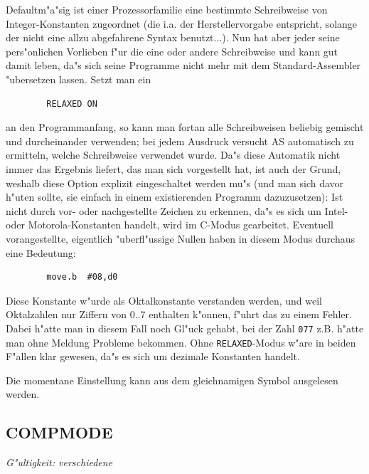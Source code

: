 \documentclass[12pt,a4paper,twoside]{report}
\makeatletter
\newcommand{\tty}[1]{{\tt #1}}
\newcommand{\ttindex}[1]{\index{#1@{\tt #1}}}
\newcommand{\asname}{AS}
\makeatother
\begin{document}
Defaultm"a"sig ist einer Prozessorfamilie eine bestimmte Schreibweise
von Integer-Konstanten zugeordnet (die i.a. der Herstellervorgabe
entspricht, solange der nicht eine allzu abgefahrene Syntax benutzt...).
Nun hat aber jeder seine pers"onlichen Vorlieben f"ur die eine oder
andere Schreibweise und kann gut damit leben, da"s sich seine Programme
nicht mehr mit dem Standard-Assembler "ubersetzen lassen. Setzt man ein
\begin{verbatim}
        RELAXED ON
\end{verbatim}
an den Programmanfang, so kann man fortan alle Schreibweisen beliebig
gemischt und durcheinander verwenden; bei jedem Ausdruck versucht \asname{}
automatisch zu ermitteln, welche Schreibweise verwendet wurde.  Da"s
diese Automatik nicht immer das Ergebnis liefert, das man sich vorgestellt
hat, ist auch der Grund, weshalb diese Option explizit eingeschaltet
werden mu"s (und man sich davor h"uten sollte, sie einfach in einem
existierenden Programm dazuzusetzen): Ist nicht durch vor- oder
nachgestellte Zeichen zu erkennen, da"s es sich um Intel- oder
Motorola-Konstanten handelt, wird im C-Modus gearbeitet.  Eventuell
vorangestellte, eigentlich "uberfl"ussige Nullen haben in diesem Modus
durchaus eine Bedeutung:
\begin{verbatim}
        move.b  #08,d0
\end{verbatim}
Diese Konstante w"urde als Oktalkonstante verstanden werden, und weil
Oktalzahlen nur Ziffern von 0..7 enthalten k"onnen, f"uhrt das zu einem
Fehler.  Dabei h"atte man in diesem Fall noch Gl"uck gehabt, bei der
Zahl \tty{077} z.B. h"atte man ohne Meldung Probleme bekommen.  Ohne
\tty{RELAXED}-Modus w"are in beiden F"allen klar gewesen, da"s es sich
um dezimale Konstanten handelt.
\par
Die momentane Einstellung kann aus dem gleichnamigen Symbol ausgelesen
werden.


\subsection{COMPMODE}
\label{SectCompMode}
\ttindex{COMPMODE}

{\em G"ultigkeit: verschiedene}
\end{document}
